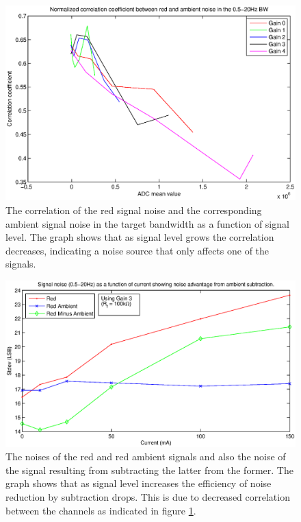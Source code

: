 \begin{figure}[htcbp!]
\begin{center}
	\includegraphics[scale=0.7]{kuvat/measurements/red_ambient_correlation.eps}
	\caption{The correlation of the red signal noise and the corresponding ambient signal noise in the target bandwidth as a function of signal level. The graph shows that as signal level grows the correlation decreases, indicating a noise source that only affects one of the signals.}
	\label{fig:red_ambient_correlation}
\end{center}
\end{figure}

\begin{figure}[htcbp!]
\begin{center}
  \includegraphics[scale=0.7]{kuvat/measurements/red_vs_ambient_noise.eps}
  \caption{The noises of the red and red ambient signals and also the noise of the signal resulting from subtracting the latter from the former. The graph shows that as signal level increases the efficiency of noise reduction by subtraction drops. This is due to decreased correlation between the channels as indicated in figure \ref{fig:red_ambient_correlation}.}
  \label{fig:red_vs_ambient_noise}
\end{center}
\end{figure}

